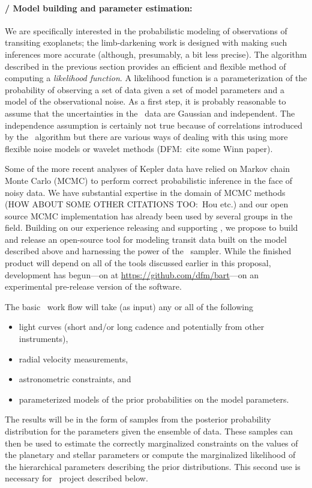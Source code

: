 \documentclass[letterpaper,12pt,preprint]{hack_aastex}
\newcommand{\Untrendy}{\package{Untrendy}}
\newcommand{\Bart}{\package{Bart}}
\newcommand{\emcee}{\package{emcee}}
\newcommand{\TheCreator}{\package{TheCreator}}
\begin{document}
\paragraph{\Bart / Model building and parameter estimation:}
We are specifically interested in the probabilistic modeling
of observations of transiting exoplanets; the limb-darkening work is designed with making such inferences more accurate (although, presumably, a bit less precise).
The algorithm described in the previous section provides an efficient and
flexible method of computing a \textit{likelihood function}.
A likelihood function is a parameterization of the probability of observing a
set of data given a set of model parameters and a model of the observational
noise.
As a first step, it is probably reasonable to assume that the uncertainties in
the \Kepler\ data are Gaussian and independent.
The independence assumption is certainly not true because of correlations
introduced by the \Untrendy\ algorithm but there are various ways of dealing
with this using more flexible noise models or wavelet methods (DFM:\ cite some
Winn paper).

Some of the more recent analyses of Kepler data have relied on Markov chain
Monte Carlo (MCMC) to perform correct probabilistic inference in the face of
noisy data.
We have substantial expertise in the domain of MCMC methods \citep{emcee} (HOW
ABOUT SOME OTHER CITATIONS TOO:\ Hou etc.) and our open source MCMC
implementation has already been used by several groups in the field.
Building on our experience releasing and supporting \emcee, we propose to
build and release an open-source tool for modeling transit data built on the
model described above and harnessing the power of the \emcee\ sampler.
While the finished product will depend on all of the tools discussed earlier
in this proposal, development has begun---on  at
\url{https://github.com/dfm/bart}---on an experimental pre-release version of
the software.

The basic \Bart\ work flow will take (as input) any or all of the following
\begin{itemize}
\item light curves (short and/or long cadence and potentially from other
instruments),
\item radial velocity measurements,
\item astronometric constraints, and
\item parameterized models of the prior probabilities on the model parameters.
\end{itemize}
The results will be in the form of samples from the posterior probability
distribution for the parameters given the ensemble of data.
These samples can then be used to estimate the correctly marginalized
constraints on the values of the planetary and stellar parameters or compute
the marginalized likelihood of the hierarchical parameters describing the
prior distributions.
This second use is necessary for \TheCreator\ project described below.
\end{document}
